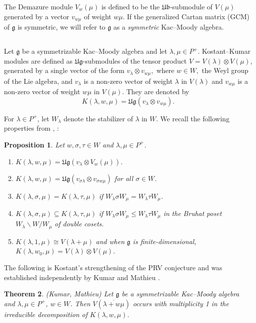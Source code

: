 \documentclass[12pt,reqno]{amsart}
\theoremstyle{plain}
\newtheorem{theorem}{Theorem}[section]
\newtheorem{proposition}[theorem]{Proposition}
\theoremstyle{definition}
\theoremstyle{remark}
\theoremstyle{plain}
\newcommand{\lie}{\mathfrak}
\begin{document}
The Demazure module $V_w(\mu)$ is defined to be the $\mathfrak{Ub}$-submodule of $V(\mu)$ generated by a vector $v_{w\mu}$ of weight $w\mu$. If the generalized Cartan matrix (GCM) of $\lie g$ is symmetric, we will refer to $\lie g$ as a {\em symmetric} Kac--Moody algebra.

\subsection{}
Let $\lie g$ be a symmetrizable Kac--Moody algebra and let $\lambda, \mu \in P^+$. Kostant--Kumar modules are defined as $\mathfrak{Ug}$-submodules of the tensor product $V=V(\lambda)\otimes V(\mu)$, generated by a single vector of the form $v_\lambda\otimes v_{w\mu},$ where $w\in W,$ the Weyl group of the Lie algebra, and $v_\lambda$ is a non-zero vector of weight $\lambda$ in $V(\lambda)$ and $v_{w\mu}$ is a non-zero vector of weight $w\mu$ in $V(\mu).$ They are denoted by \[K(\lambda,w,\mu)=\mathfrak{Ug}(v_{\lambda}\otimes v_{w\mu}).\]


For $\lambda \in P^+$, let $W_\lambda$ denote the stabilizer of $\lambda$ in $W$. We recall the following properties from \cite{KRV}, \cite{KRV2}:
\begin{proposition}\label{prop:kkprops}
Let $w, \sigma, \tau \in W$ and  $\lambda, \mu \in P^+$.
\begin{enumerate}
\item $K(\lambda,w,\mu) = \mathfrak{Ug}(v_{\lambda}\otimes V_w(\mu))$.
\item $K(\lambda, w, \mu) = \lie{Ug}(v_{\sigma \lambda} \otimes v_{\sigma w\mu})$ for all $\sigma \in W$.
\item  $K(\lambda,\sigma,\mu) = K(\lambda,\tau,\mu)$ if $W_\lambda \sigma W_\mu = W_\lambda \tau W_\mu$.
\item $K(\lambda,\sigma,\mu) \subseteq K(\lambda,\tau,\mu)$  if $W_\lambda \sigma W_\mu \leq W_\lambda \tau W_\mu$ in the Bruhat poset  $W_\lambda \backslash W /W_\mu$ of double cosets.
\item $K(\lambda,1,\mu) \cong V(\lambda+\mu)$ and when $\lie g$ is finite-dimensional, $K(\lambda,w_0,\mu) = V(\lambda) \otimes V(\mu) $.
\end{enumerate}
\end{proposition}


The following is Kostant's strengthening of the PRV conjecture and was established independently by Kumar \cite{Kum1} and Mathieu \cite{M1}.
\begin{theorem}\label{thm:kprv} (Kumar, Mathieu) 
Let $\lie g$ be a symmetrizable Kac--Moody algebra and $\lambda, \mu \in P^+$, $w \in W$. Then $V(\overline{\lambda+w\mu})$ occurs with multiplicity 1 in the irreducible decomposition of $K(\lambda,w,\mu)$. 
\end{theorem}
\end{document}
